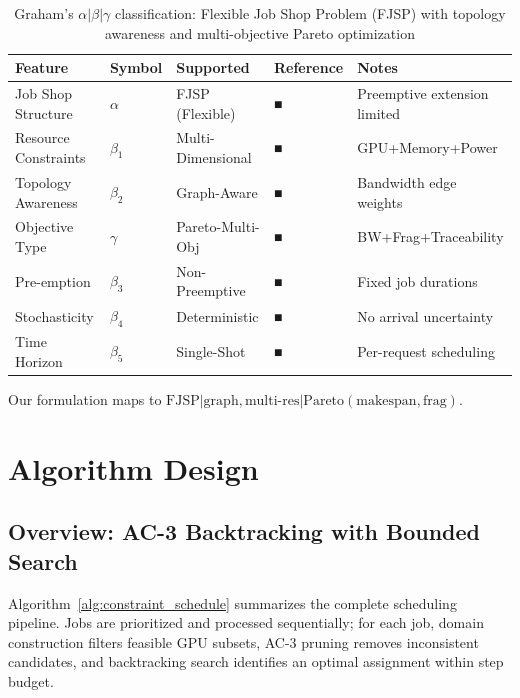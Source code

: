 \documentclass[11pt, twoside]{article}
\begin{document}
\begin{table}[h]
\centering
\begin{tabular}{lllll}
\toprule
Feature & Symbol & Supported & Reference & Notes \\
\midrule
Job Shop Structure & $\alpha$ & FJSP (Flexible) & ■ & Preemptive extension limited \\
Resource Constraints & $\beta_1$ & Multi-Dimensional & ■ & GPU+Memory+Power \\
Topology Awareness & $\beta_2$ & Graph-Aware & ■ & Bandwidth edge weights \\
Objective Type & $\gamma$ & Pareto-Multi-Obj & ■ & BW+Frag+Traceability \\
Pre-emption & $\beta_3$ & Non-Preemptive & ■ & Fixed job durations \\
Stochasticity & $\beta_4$ & Deterministic & ■ & No arrival uncertainty \\
Time Horizon & $\beta_5$ & Single-Shot & ■ & Per-request scheduling \\
\bottomrule
\end{tabular}
\caption{Graham's $\alpha|\beta|\gamma$ classification: Flexible Job Shop Problem (FJSP) with topology awareness and multi-objective Pareto optimization}
\label{tab:graham_classification}
\end{table}

Our formulation maps to $\text{FJSP}|\text{graph},\text{multi-res}|\text{Pareto}(\text{makespan},\text{frag})$.

\section{Algorithm Design}

\subsection{Overview: AC-3 Backtracking with Bounded Search}

Algorithm~\ref{alg:constraint_schedule} summarizes the complete scheduling pipeline. Jobs are prioritized and processed sequentially; for each job, domain construction filters feasible GPU subsets, AC-3 pruning removes inconsistent candidates, and backtracking search identifies an optimal assignment within step budget.
\end{document}
